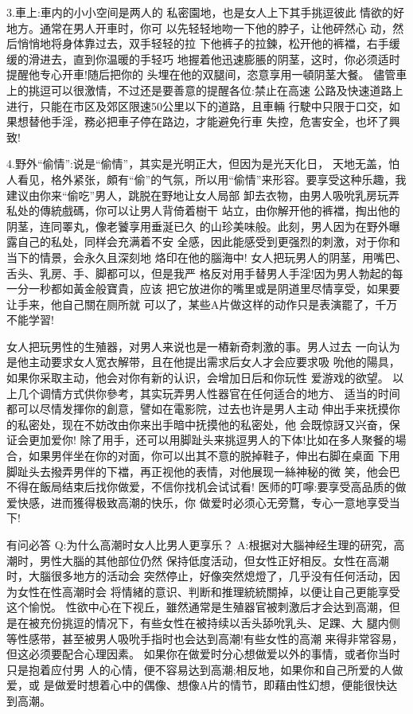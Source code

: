 \documentclass[12pt,UTF8]{ctexbook}
\begin{document}
3.車上:車内的小小空间是两人的
私密園地，也是女人上下其手挑逗彼此
情欲的好地方。通常在男人开車时，你可
以先轻轻地吻一下他的脖子，让他砰然心
动，然后悄悄地将身体靠过去，双手轻轻的拉
下他裤子的拉鍊，松开他的裤襠，右手缓缓的滑进去，直到你温暖的手轻巧
地握着他迅速膨脹的阴茎，这时，你必须适时提醒他专心开車!随后把你的
头埋在他的双腿间，恣意享用一頓阴茎大餐。
儘管車上的挑逗可以很激情，不过还是要善意的提醒各位:禁止在高速
公路及快速道路上进行，只能在市区及郊区限速50公里以下的道路，且車輛
行駛中只限于口交，如果想替他手淫，務必把車子停在路边，才能避免行車
失控，危害安全，也坏了興致!

4.野外“偷情”:说是“偷情”，其实是光明正大，但因为是光天化日，
天地无盖，怕人看见，格外紧张，頗有“偷”的气氛，所以用“偷情”来形容。要享受这种乐趣，我建议由你来“偷吃”男人，跳脱在野地让女人局部
卸去衣物，由男人吸吮乳房玩弄私处的傳統戲碼，你可以让男人背倚着樹干
站立，由你解开他的裤襠，掏出他的阴茎，连同睪丸，像老饕享用垂涎已久
的山珍美味般。此刻，男人因为在野外曝露自己的私处，同样会充满着不安
全感，因此能感受到更强烈的刺激，对于你和当下的情景，会永久且深刻地
烙印在他的腦海中!
女人把玩男人的阴茎，用嘴巴、舌头、乳房、手、脚都可以，但是我严
格反对用手替男人手淫!因为男人勃起的每一分一秒都如黃金般寶貴，应该
把它放进你的嘴里或是阴道里尽情享受，如果要让手来，他自己關在厕所就
可以了，某些A片做这样的动作只是表演罷了，千万不能学習!

女人把玩男性的生殖器，对男人来说也是一樁新奇刺激的事。男人过去
一向认为是他主动要求女人宽衣解带，且在他提出需求后女人才会应要求吸
吮他的陽具，如果你采取主动，他会对你有新的认识，会增加日后和你玩性
爱游戏的欲望。
以上几个调情方式供你參考，其实玩弄男人性器官在任何适合的地方、
适当的时间都可以尽情发揮你的創意，譬如在電影院，过去也许是男人主动
伸出手来抚摸你的私密处，现在不妨改由你来出手暗中抚摸他的私密处，他
会既惊訝又兴奋，保证会更加爱你!
除了用手，还可以用脚趾头来挑逗男人的下体!比如在多人聚餐的場
合，如果男伴坐在你的对面，你可以出其不意的脱掉鞋子，伸出右脚在桌面
下用脚趾头去撥弄男伴的下襠，再正视他的表情，对他展现一絲神秘的微
笑，他会巴不得在飯局结束后找你做爱，不信你找机会试试看!
医师的叮嚀:要享受高品质的做爱快感，进而獲得极致高潮的快乐，你
做爱时必须心无旁鶩，专心一意地享受当下!

有问必答
Q:为什么高潮时女人比男人更享乐？
A:根据对大腦神经生理的研究，高潮时，男性大腦的其他部位仍然
保持低度活动，但女性正好相反。女性在高潮时，大腦很多地方的活动会
突然停止，好像突然熄燈了，几乎没有任何活动，因为女性在性高潮时会
将情緒的意识、判断和推理統統關掉，以便让自己更能享受这个愉悦。
性欲中心在下视丘，雖然通常是生殖器官被刺激后才会达到高潮，但
是在被充份挑逗的情况下，有些女性在被持续以舌头舔吮乳头、足踝、大
腿内侧等性感带，甚至被男人吸吮手指时也会达到高潮!有些女性的高潮
来得非常容易，但这必须要配合心理因素。
如果你在做爱时分心想做爱以外的事情，或者你当时只是抱着应付男
人的心情，便不容易达到高潮;相反地，如果你和自己所爱的人做爱，或
是做爱时想着心中的偶像、想像A片的情节，即藉由性幻想，便能很快达
到高潮。
\end{document}
